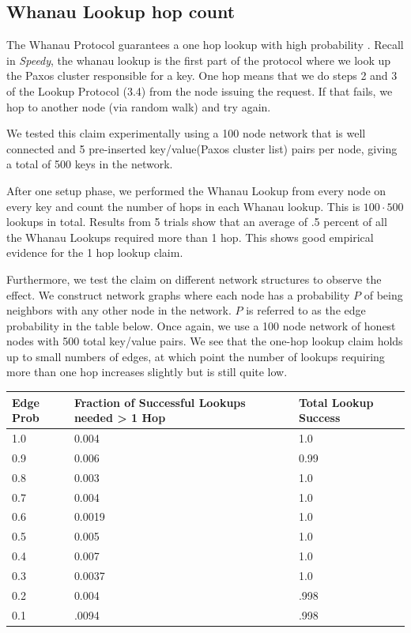 \documentclass[letter]{article}
\newcommand{\sys}{\textit{Speedy}\space}
\begin{document}
\subsection{Whanau Lookup hop count}
The Whanau Protocol guarantees a one hop lookup with high probability \cite{whanau}. Recall in \sys, the whanau lookup is the first part of the protocol where we look up the Paxos cluster responsible for a key. One hop means that we do steps 2 and 3 of the Lookup Protocol (3.4) from the node issuing the request. If that fails, we hop to another node (via random walk) and try again.


We tested this claim experimentally using a 100 node network that is well connected and 5 pre-inserted key/value(Paxos cluster list) pairs per node, giving a total of 500 keys in the network.

After one setup phase, we performed the Whanau Lookup from every node on every key and count the number of hops in each Whanau lookup. This is $100 \cdot 500$ lookups in total. Results from 5 trials show that an average of .5 percent of all the Whanau Lookups required more than 1 hop. This shows good empirical evidence for the 1 hop lookup claim.

Furthermore, we test the claim on different network structures to observe the effect. We construct network graphs where each node has a probability $P$ of being neighbors with any other node in the network. $P$ is referred to as the edge probability in the table below. Once again, we use a 100 node network of honest nodes with 500 total key/value pairs. We see
that the one-hop lookup claim holds up to small numbers of
edges, at which point the number of lookups requiring more than one
hop increases slightly but is still quite low.\\

\begin{center}
\begin{tabular}{| l | l | l |}
\hline
Edge Prob & Fraction of Successful Lookups needed > 1 Hop & Total Lookup Success\\ \hline
1.0 & 0.004 & 1.0\\ \hline
0.9 & 0.006 & 0.99\\ \hline
0.8 & 0.003 & 1.0\\ \hline
0.7 & 0.004 & 1.0\\ \hline
0.6 & 0.0019 & 1.0\\ \hline
0.5 & 0.005 & 1.0\\ \hline
0.4 & 0.007 & 1.0\\ \hline
0.3 & 0.0037 & 1.0\\ \hline
0.2 & 0.004 & .998\\ \hline
0.1 & .0094 & .998\\ \hline
\end{tabular}
\end{center}
\end{document}
